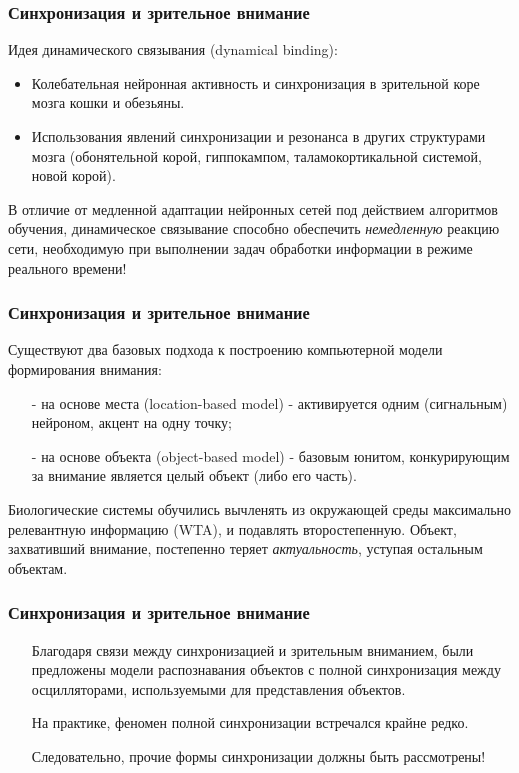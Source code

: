 \documentclass{beamer}
\begin{document}

\begin{frame}
\frametitle{Синхронизация и зрительное внимание}

Идея динамического связывания (dynamical binding):

\begin{itemize}
\item Колебательная нейронная активность и синхронизация в зрительной коре мозга кошки и обезьяны.
\item Использования явлений синхронизации и резонанса в других структурами мозга (обонятельной корой, гиппокампом, таламокортикальной системой, новой корой).
\end{itemize}
\pause
В отличие от медленной адаптации нейронных сетей под действием алгоритмов обучения, динамическое связывание способно обеспечить \textit{немедленную} реакцию сети, необходимую при выполнении задач обработки информации в режиме реального времени!

\end{frame}


\begin{frame}
\frametitle{Синхронизация и зрительное внимание}

Существуют два базовых подхода к построению компьютерной модели формирования внимания:
\begin{itemize}
\item[-] на основе места (location-based model) - активируется одним (сигнальным) нейроном, акцент на одну точку;
\item[-] на основе объекта (object-based model) - базовым юнитом, конкурирующим за внимание является целый объект (либо его часть).
\end{itemize}
\pause
Биологические системы обучились вычленять из окружающей среды максимально релевантную информацию (WTA), и подавлять второстепенную. Объект, захвативший внимание, постепенно теряет \textit{актуальность}, уступая остальным объектам.

\end{frame}


\begin{frame}
\frametitle{Синхронизация и зрительное внимание}

\begin{itemize}
\item[]Благодаря связи между синхронизацией и зрительным вниманием, были предложены модели распознавания объектов с полной синхронизация между осцилляторами, используемыми для представления объектов.
\bigskip
\pause
\item[]На практике, феномен полной синхронизации встречался крайне редко.
\bigskip
\pause
\item[]Следовательно, прочие формы синхронизации должны быть рассмотрены! 
\end{itemize}

\end{frame}
\end{document}
